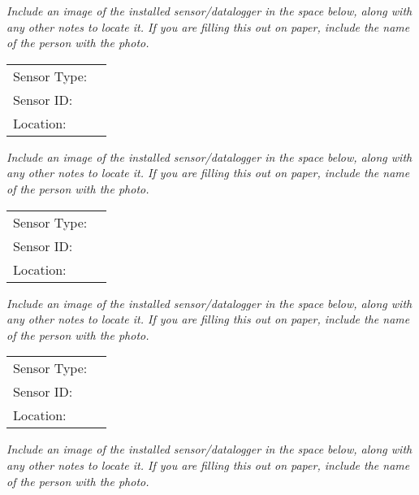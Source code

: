 \documentclass[./main.tex]{subfiles}
\begin{document}
\noindent \emph{Include an image of the installed sensor/datalogger in the space below,  along with any other notes to locate it.  If you are filling this out on paper, include the name of the person with the photo. }

\vspace{8cm}

\noindent\begin{tabularx}{\textwidth}{@{}lX@{}}
Sensor Type: & \hrulefill \\[2ex]
Sensor ID: & \hrulefill \\[2ex]
Location: & \hrulefill \\[2ex]
\end{tabularx}

\noindent \emph{Include an image of the installed sensor/datalogger in the space below,  along with any other notes to locate it.  If you are filling this out on paper, include the name of the person with the photo. }

\vspace{8cm}

\noindent\begin{tabularx}{\textwidth}{@{}lX@{}}
Sensor Type: & \hrulefill \\[2ex]
Sensor ID: & \hrulefill \\[2ex]
Location: & \hrulefill \\[2ex]
\end{tabularx}

\noindent \emph{Include an image of the installed sensor/datalogger in the space below,  along with any other notes to locate it.  If you are filling this out on paper, include the name of the person with the photo. }

\vspace{8cm}

\noindent\begin{tabularx}{\textwidth}{@{}lX@{}}
Sensor Type: & \hrulefill \\[2ex]
Sensor ID: & \hrulefill \\[2ex]
Location: & \hrulefill \\[2ex]
\end{tabularx}

\noindent \emph{Include an image of the installed sensor/datalogger in the space below,  along with any other notes to locate it.  If you are filling this out on paper, include the name of the person with the photo. }

\vspace{8cm}
\end{document}
